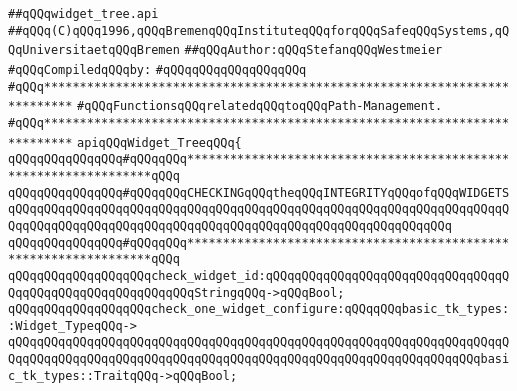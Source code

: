 \label{src/lib/tk/src/widget_tree.api}
\verb|##qQQqwidget_tree.api|\newline
\verb|##qQQq(C)qQQq1996,qQQqBremenqQQqInstituteqQQqforqQQqSafeqQQqSystems,qQQqUniversitaetqQQqBremen|\newline
\verb|##qQQqAuthor:qQQqStefanqQQqWestmeier|\newline
\newline
\verb|#qQQqCompiledqQQqby:|\newline
\verb|#qQQqqQQqqQQqqQQqqQQq|\newline
\newline
\newline
\newline
\verb|#qQQq**************************************************************************|\newline
\verb|#qQQqFunctionsqQQqrelatedqQQqtoqQQqPath-Management.|\newline
\verb|#qQQq**************************************************************************|\newline
\newline
\newline
\newline
\verb|apiqQQqWidget_TreeqQQq{|\newline
\newline
\verb|qQQqqQQqqQQqqQQq#qQQqqQQq*****************************************************************qQQq|\newline
\verb|qQQqqQQqqQQqqQQq#qQQqqQQqCHECKINGqQQqtheqQQqINTEGRITYqQQqofqQQqWIDGETSqQQqqQQqqQQqqQQqqQQqqQQqqQQqqQQqqQQqqQQqqQQqqQQqqQQqqQQqqQQqqQQqqQQqqQQqqQQqqQQqqQQqqQQqqQQqqQQqqQQqqQQqqQQqqQQqqQQqqQQqqQQqqQQqqQQq|\newline
\verb|qQQqqQQqqQQqqQQq#qQQqqQQq*****************************************************************qQQq|\newline
\newline
\verb|qQQqqQQqqQQqqQQqqQQqcheck_widget_id:qQQqqQQqqQQqqQQqqQQqqQQqqQQqqQQqqQQqqQQqqQQqqQQqqQQqqQQqqQQqStringqQQq->qQQqBool;|\newline
\newline
\verb|qQQqqQQqqQQqqQQqqQQqcheck_one_widget_configure:qQQqqQQqbasic_tk_types::Widget_TypeqQQq->|\newline
\verb|qQQqqQQqqQQqqQQqqQQqqQQqqQQqqQQqqQQqqQQqqQQqqQQqqQQqqQQqqQQqqQQqqQQqqQQqqQQqqQQqqQQqqQQqqQQqqQQqqQQqqQQqqQQqqQQqqQQqqQQqqQQqqQQqqQQqqQQqbasic_tk_types::TraitqQQq->qQQqBool;|\newline
